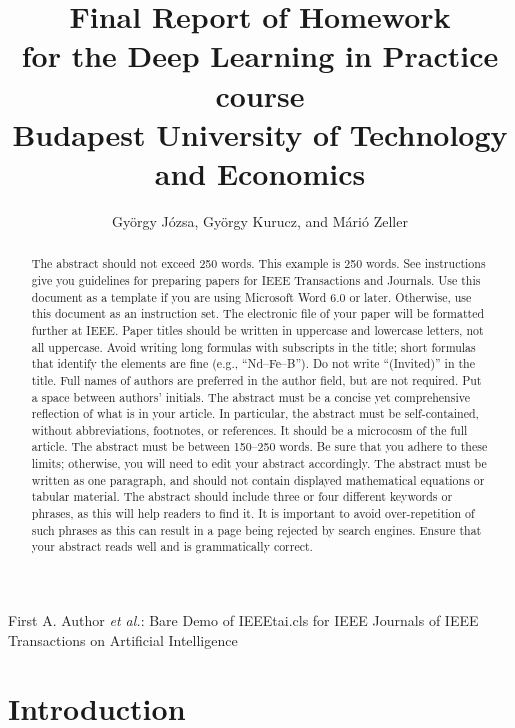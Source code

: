 \documentclass[12pt,conference]{IEEEtran}
\begin{document}
\title{%
	Final Report of Homework \\
	\large for the Deep Learning in Practice course \\
	[0.3em] Budapest University of Technology and Economics}

\author{György Józsa, György Kurucz, and Márió Zeller}

{First A. Author \MakeLowercase{\textit{et al.}}: Bare Demo of IEEEtai.cls for IEEE Journals of IEEE Transactions on Artificial Intelligence}

\maketitle

\begin{abstract}
The abstract should not exceed 250 words. This example is 250 words. See instructions give you guidelines for preparing papers for IEEE Transactions and Journals. Use this document as a template if you are using Microsoft Word 6.0 or later. Otherwise, use this document as an instruction set. The electronic file of your paper will be formatted further at IEEE. Paper titles should be written in uppercase and lowercase letters, not all uppercase. Avoid writing long formulas with subscripts in the title; short formulas that identify the elements are fine (e.g., ``Nd--Fe--B''). Do not write ``(Invited)'' in the title. Full names of authors are preferred in the author field, but are not required. Put a space between authors' initials. The abstract must be a concise yet comprehensive reflection of what is in your article. In particular, the abstract must be self-contained, without abbreviations, footnotes, or references. It should be a microcosm of the full article. The abstract must be between 150--250 words. Be sure that you adhere to these limits; otherwise, you will need to edit your abstract accordingly. The abstract must be written as one paragraph, and should not contain displayed mathematical equations or tabular material. The abstract should include three or four different keywords or phrases, as this will help readers to find it. It is important to avoid over-repetition of such phrases as this can result in a page being rejected by search engines. Ensure that your abstract reads well and is grammatically correct.
\end{abstract}

\section{Introduction}
\end{document}
